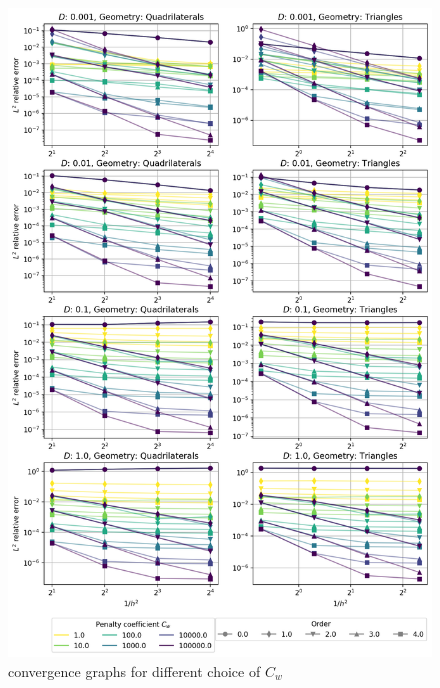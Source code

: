 \begin{figure}[p!]
	\centering
	\includegraphics[height=\textheight]{../figs/parametric/advdiff_2D/quarteroni1.png}
	\caption{ convergence graphs for different choice of $C_w$}
	\label{fig:qconv1}
\end{figure}

